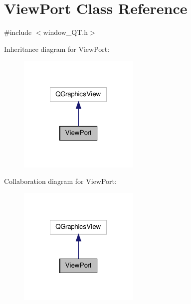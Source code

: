 \hypertarget{classViewPort}{\section{View\-Port Class Reference}
\label{classViewPort}
}


{\ttfamily \#include $<$window\-\_\-\-Q\-T.\-h$>$}



Inheritance diagram for View\-Port\-:\nopagebreak
\begin{figure}[H]
\begin{center}
\leavevmode
\includegraphics[width=164pt]{classViewPort__inherit__graph}
\end{center}
\end{figure}


Collaboration diagram for View\-Port\-:\nopagebreak
\begin{figure}[H]
\begin{center}
\leavevmode
\includegraphics[width=164pt]{classViewPort__coll__graph}
\end{center}
\end{figure}
